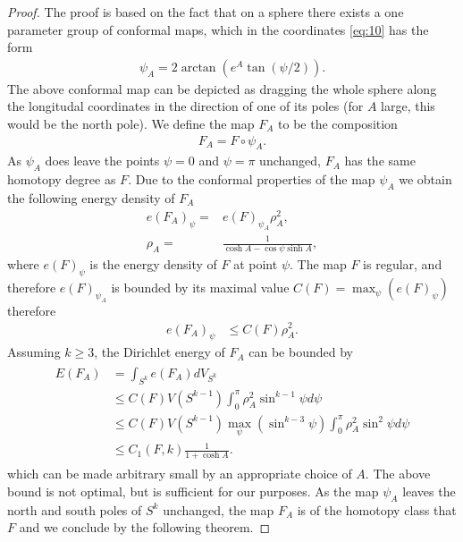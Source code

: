 \begin{proof}
  The proof is based on the fact that on a sphere there exists a one
  parameter group of conformal maps, which in the coordinates
  \eqref{eq:10} has the form
  \begin{align}
    \label{eq:13}
    \psi_A=2\arctan(e^A\tan(\psi/2)).
  \end{align}
  The above conformal map can be depicted as dragging the whole sphere
  along the longitudal coordinates in the direction of one of its
  poles (for $A$ large, this would be the north pole). We define the
  map $F_A$ to be the composition
  \begin{align}
    \label{eq:14}
    F_A=F\circ\psi_A.
  \end{align}
  As $\psi_A$ does leave the points $\psi=0$ and $\psi=\pi$ unchanged,
  $F_A$ has the same homotopy degree as $F$. Due to the conformal
  properties of the map $\psi_A$ we obtain the following energy
  density of $F_A$
  \begin{align}
    \label{eq:15}
    e(F_A)_\psi=&e(F)_{\psi_A}\rho_A^2,\\
    \rho_A=&\frac{1}{\cosh A-\cos\psi\sinh A},
  \end{align}
  where $e(F)_\psi$ is the energy density of $F$ at point $\psi$.  The
  map $F$ is regular, and therefore $e(F)_{\psi_A}$ is bounded by its
  maximal value $C(F)=\max_\psi\left(e(F)_\psi\right)$ therefore
  \begin{align}
    \label{eq:16}
    e(F_A)_\psi&\le C(F)\rho_A^2.
  \end{align}
  Assuming $k\ge3$, the Dirichlet energy of $F_A$ can be bounded by
  \begin{align}
    \label{eq:17}
    \begin{split}
      E(F_A)&=\int_{S^k}e(F_A)dV_{S^k}\\
      &\le C(F)V(S^{k-1})\int_{0}^{\pi}\rho_A^2\sin^{k-1}\psi d\psi\\
      &\le C(F)V(S^{k-1})\max_\psi(\sin^{k-3}\psi)\int_{0}^{\pi}\rho_A^2\sin^2\psi d\psi\\
      &\le C_1(F,k)\frac{1}{1+\cosh A}.
    \end{split}
  \end{align}
  which can be made arbitrary small by an appropriate choice of
  $A$. The above bound is not optimal, but is sufficient for our
  purposes. As the map $\psi_A$ leaves the north and south poles of
  $S^k$ unchanged, the map $F_A$ is of the homotopy class that $F$ and
  we conclude by the following theorem.

\end{proof}




